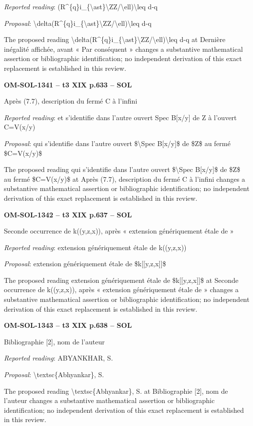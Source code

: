 \emph{Reported reading}: (R\textasciicircum{}\{q\}i\_\{\textbackslash{}ast\}\textbackslash{}ZZ/\textbackslash{}ell)\textbackslash{}leq d-q\par
\emph{Proposal}: \textbackslash{}delta(R\textasciicircum{}\{q\}i\_\{\textbackslash{}ast\}\textbackslash{}ZZ/\textbackslash{}ell)\textbackslash{}leq d-q\par
The proposed reading \textbackslash{}delta(R\textasciicircum{}\{q\}i\_\{\textbackslash{}ast\}\textbackslash{}ZZ/\textbackslash{}ell)\textbackslash{}leq d-q at Dernière inégalité affichée, avant « Par conséquent » changes a substantive mathematical assertion or bibliographic identification; no independent derivation of this exact replacement is established in this review.\par
\par\noindent\textbf{OM-SOL-1341 -- t3 XIX p.633 -- SOL}\par
Après (7.7), description du fermé C à l'infini\par
\emph{Reported reading}: et s'identifie dans l'autre ouvert Spec B[x/y] de Z à l'ouvert C=\allowbreak V(x/y)\par
\emph{Proposal}: qui s'identifie dans l'autre ouvert \$\textbackslash{}Spec B[x/y]\$ de \$Z\$ au fermé \$C=\allowbreak V(x/y)\$\par
The proposed reading qui s'identifie dans l'autre ouvert \$\textbackslash{}Spec B[x/y]\$ de \$Z\$ au fermé \$C=\allowbreak V(x/y)\$ at Après (7.7), description du fermé C à l'infini changes a substantive mathematical assertion or bibliographic identification; no independent derivation of this exact replacement is established in this review.\par
\par\noindent\textbf{OM-SOL-1342 -- t3 XIX p.637 -- SOL}\par
Seconde occurrence de k((y,z,x)), après « extension génériquement étale de »\par
\emph{Reported reading}: extension génériquement étale de k((y,z,x))\par
\emph{Proposal}: extension génériquement étale de \$k[[y,z,x]]\$\par
The proposed reading extension génériquement étale de \$k[[y,z,x]]\$ at Seconde occurrence de k((y,z,x)), après « extension génériquement étale de » changes a substantive mathematical assertion or bibliographic identification; no independent derivation of this exact replacement is established in this review.\par
\par\noindent\textbf{OM-SOL-1343 -- t3 XIX p.638 -- SOL}\par
Bibliographie [2], nom de l'auteur\par
\emph{Reported reading}: ABYANKHAR, S.\par
\emph{Proposal}: \textbackslash{}textsc\{Abhyankar\}, S.\par
The proposed reading \textbackslash{}textsc\{Abhyankar\}, S. at Bibliographie [2], nom de l'auteur changes a substantive mathematical assertion or bibliographic identification; no independent derivation of this exact replacement is established in this review.\par
\endgroup
